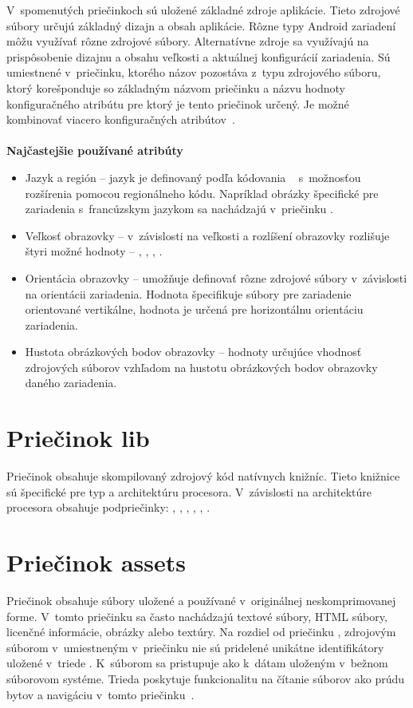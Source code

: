\noindent V~spomenutých priečinkoch sú uložené základné zdroje aplikácie. Tieto zdrojové súbory určujú základný dizajn a obsah aplikácie. Rôzne typy Android zariadení môžu využívať rôzne zdrojové súbory. Alternatívne zdroje sa využívajú na prispôsobenie dizajnu a obsahu veľkosti a aktuálnej konfigurácií zariadenia. Sú umiestnené v~priečinku, ktorého názov pozostáva z~typu zdrojového súboru, ktorý korešponduje so základným názvom priečinku a názvu hodnoty konfiguračného atribútu pre ktorý je tento priečinok určený. Je možné kombinovať viacero konfiguračných atribútov~\cite{providingAltRes}.\\\\
\textbf{Najčastejšie používané atribúty}
\begin{itemize}
\item Jazyk a región -- jazyk je definovaný podľa kódovania ~\cite{isoCodes} s~možnosťou rozšírenia pomocou  regionálneho kódu. Napríklad obrázky špecifické pre zariadenia s~francúzskym jazykom sa nachádzajú v~priečinku .
\item Veľkosť obrazovky -- v~závislosti na veľkosti a rozlíšení obrazovky rozlišuje štyri možné hodnoty -- , , , .
\item Orientácia obrazovky -- umožňuje definovať rôzne zdrojové súbory v~závislosti na orientácii zariadenia. Hodnota  špecifikuje súbory pre zariadenie orientované vertikálne, hodnota  je určená pre horizontálnu orientáciu zariadenia.	
\item Hustota obrázkových bodov obrazovky -- hodnoty určujúce vhodnosť zdrojových súborov vzhľadom na hustotu obrázkových bodov obrazovky daného zariadenia.
\end{itemize}


\section{Priečinok lib}
\label{lib}
Priečinok  obsahuje skompilovaný zdrojový kód natívnych knižníc. Tieto knižnice sú špecifické pre typ a architektúru procesora. V~závislosti na architektúre procesora obsahuje podpriečinky: , , , , , .

\section{Priečinok assets}
\label{assets}
Priečinok  obsahuje súbory uložené a používané v~originálnej neskomprimovanej forme. V~tomto priečinku sa často nachádzajú textové súbory, HTML súbory, licenčné informácie, obrázky alebo textúry. Na rozdiel od priečinku , zdrojovým súborom v~umiestneným v~priečinku  nie sú pridelené unikátne identifikátory uložené v~triede . K~súborom sa pristupuje ako k~dátam uloženým v~bežnom súborovom systéme. Trieda  poskytuje funkcionalitu na čítanie súborov ako prúdu bytov a navigáciu v~tomto priečinku~\cite{AssetManager}.

